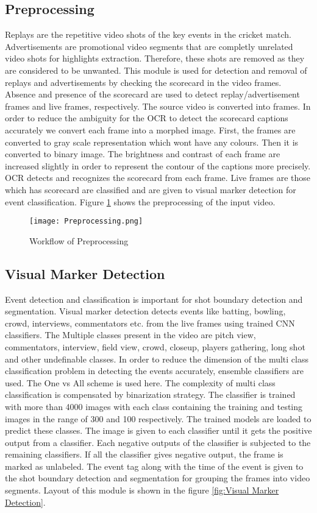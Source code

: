 \subsection{Preprocessing}
Replays are the repetitive video shots of the key events in the cricket match. Advertisements are promotional video segments that are completly unrelated video shots for highlights extraction. Therefore, these shots are removed as they are considered to be unwanted. This module is used for detection and removal of replays and advertisements by checking the scorecard in the video frames. Absence and presence of the scorecard are used to detect replay/advertisement frames and live frames, respectively. The source video is converted into frames. In order to reduce the ambiguity for the OCR to detect the scorecard captions accurately we convert each frame into a morphed image. First, the frames are converted to gray scale representation which wont have any colours. Then it is converted to binary image. The brightness and contrast of each frame are increased slightly in order to represent the contour of the captions more precisely. OCR detects and recognizes the scorecard from each frame. Live frames are those which has scorecard are classified and are given to visual marker detection for event classification. Figure \ref{fig:preprocessing} shows the preprocessing of the input video.
\begin{figure}[h]
    \centering
   \texttt{[image: Preprocessing.png]}
    \caption{Workflow of Preprocessing}
    \label{fig:preprocessing}
\end{figure}

\newpage
\subsection{Visual Marker Detection}
Event detection and classification is important for shot boundary detection and segmentation. Visual marker detection detects events like batting, bowling, crowd, interviews, commentators etc. from the live frames using trained CNN classifiers. The Multiple classes present in the video are pitch view, commentators, interview, field view, crowd, closeup, players gathering, long shot and other undefinable classes. In order to reduce the dimension of the multi class classification problem in detecting the events accurately, ensemble classifiers  are used. The One vs All scheme\cite{Galar:2011:OEM:1963661.1963815} is used here. The complexity of multi class classification is compensated by binarization strategy. The classifier is trained with more than 4000 images with each class containing the training and testing images in the range of 300 and 100 respectively. The trained models are loaded to predict these  classes. The image is given to each classifier until it gets the positive output from a classifier. Each negative outputs of the classifier is subjected to the remaining classifiers. If all the classifier gives negative output, the frame is marked as unlabeled. The event tag along with the time of the event is given to the shot boundary detection and segmentation for grouping the frames into video segments. Layout of this module is shown in the figure \ref{fig:Visual Marker Detection}.

